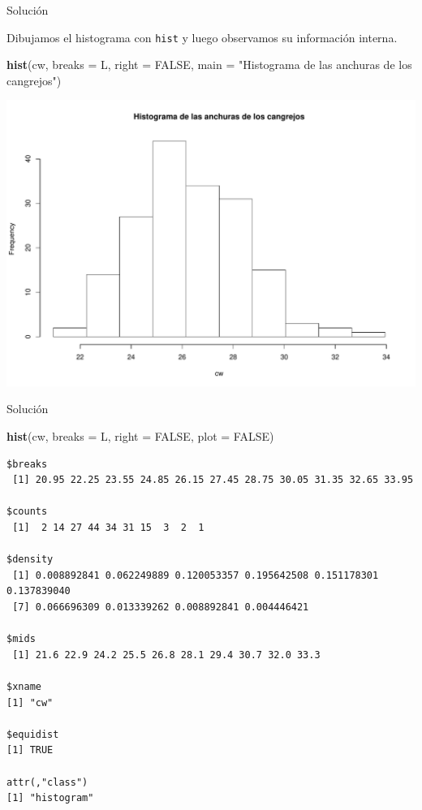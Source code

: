 \documentclass[
  ignorenonframetext,
]{beamer}
\newenvironment{Shaded}{\begin{snugshade}}{\end{snugshade}}
\newcommand{\DataTypeTok}[1]{\textcolor[rgb]{0.13,0.29,0.53}{#1}}
\newcommand{\KeywordTok}[1]{\textcolor[rgb]{0.13,0.29,0.53}{\textbf{#1}}}
\newcommand{\NormalTok}[1]{#1}
\newcommand{\OtherTok}[1]{\textcolor[rgb]{0.56,0.35,0.01}{#1}}
\newcommand{\StringTok}[1]{\textcolor[rgb]{0.31,0.60,0.02}{#1}}
\begin{document}
\begin{frame}[fragile]{Solución}
\protect\hypertarget{soluciuxf3n-37}{}

Dibujamos el histograma con \texttt{hist} y luego observamos su
información interna.

\begin{Shaded}
\begin{Highlighting}[]
\KeywordTok{hist}\NormalTok{(cw, }\DataTypeTok{breaks =}\NormalTok{ L, }\DataTypeTok{right =} \OtherTok{FALSE}\NormalTok{, }\DataTypeTok{main =} \StringTok{"Histograma de las anchuras de los cangrejos"}\NormalTok{)}
\end{Highlighting}
\end{Shaded}

\includegraphics{Tema9.-Agrupacion_datos_cuantitativos_files/figure-beamer/unnamed-chunk-52-1.pdf}

\end{frame}

\begin{frame}[fragile]{Solución}
\protect\hypertarget{soluciuxf3n-38}{}

\begin{Shaded}
\begin{Highlighting}[]
\KeywordTok{hist}\NormalTok{(cw, }\DataTypeTok{breaks =}\NormalTok{ L, }\DataTypeTok{right =} \OtherTok{FALSE}\NormalTok{, }\DataTypeTok{plot =} \OtherTok{FALSE}\NormalTok{)}
\end{Highlighting}
\end{Shaded}

\begin{verbatim}
$breaks
 [1] 20.95 22.25 23.55 24.85 26.15 27.45 28.75 30.05 31.35 32.65 33.95

$counts
 [1]  2 14 27 44 34 31 15  3  2  1

$density
 [1] 0.008892841 0.062249889 0.120053357 0.195642508 0.151178301 0.137839040
 [7] 0.066696309 0.013339262 0.008892841 0.004446421

$mids
 [1] 21.6 22.9 24.2 25.5 26.8 28.1 29.4 30.7 32.0 33.3

$xname
[1] "cw"

$equidist
[1] TRUE

attr(,"class")
[1] "histogram"
\end{verbatim}

\end{frame}
\end{document}
